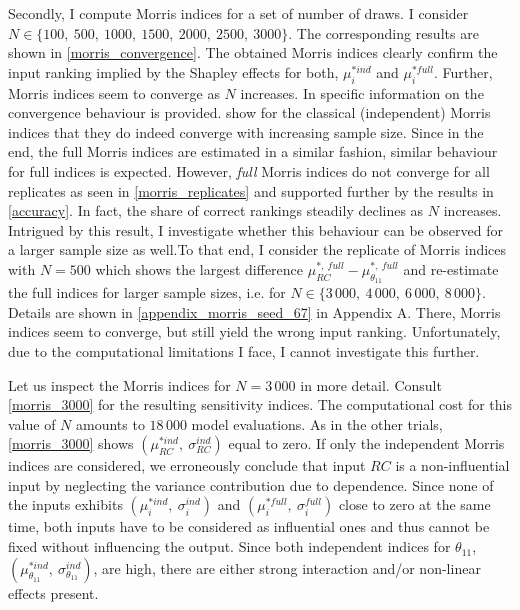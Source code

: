 Secondly, I compute Morris indices for a set of number of draws. I consider $N \in \{100,\ 500,\ 1000,\ 1500,\ 2000,\ 2500,\ 3000\}$. The corresponding results are shown in \cref{morris_convergence}. The obtained Morris indices clearly confirm the input ranking implied by the Shapley effects for both, $\mu^{\ast ind}_i$ and $\mu^{\ast full}_i$. Further, Morris indices
seem to converge as $N$ increases. In  specific information on the convergence behaviour is provided. \citet{ASAV19} show for the classical (independent) Morris indices that they do indeed converge with increasing sample size. Since in the end, the full Morris indices are estimated in a similar fashion, similar behaviour for full indices is expected. However, \textit{full} Morris indices do not converge for all replicates as seen in \cref{morris_replicates} and supported further by the results in \cref{accuracy}. In fact, the share of correct rankings steadily declines as $N$ increases. Intrigued by this result, I investigate whether this behaviour can be observed for a larger sample size as well.To that end, I consider the replicate of Morris indices with $N=500$ which shows the largest difference $\mu^{\ast,\ full}_{RC} - \mu^{\ast,\ full}_{\theta_{11}}$ and re-estimate the full indices for larger sample sizes, i.e. for $N \in \{3\,000,\ 4\,000,\ 6\,000,\ 8\,000\}$. Details are shown in \cref{appendix_morris_seed_67} in Appendix A. There, Morris indices seem to converge, but still yield the wrong input ranking. Unfortunately, due to the computational limitations I face, I cannot investigate this further.

Let us inspect the Morris indices for $N = 3\,000$ in more detail. Consult \cref{morris_3000} for the
resulting sensitivity indices. The computational cost for this value of $N$ amounts to $18\,000$
model evaluations. As in the other trials, \cref{morris_3000} shows $(\mu^{\ast ind}_{RC},\ \sigma_{RC}^{ind})$ equal to zero.
If only the independent Morris indices are considered, we erroneously
conclude that input $RC$ is a non-influential input by neglecting the variance contribution due to dependence. Since none of the inputs exhibits $(\mu^{\ast ind}_i,\ \sigma_i^{ind})$ and $(\mu^{\ast full}_i,\ \sigma_i^{full})$ close to zero at the same time, both inputs have to be considered as influential ones and thus cannot be fixed without influencing the output.
Since both independent indices for $\theta_{11}$, $(\mu^{\ast ind}_{\theta_{11}},\ \sigma_{\theta_{11}}^{ind})$, are high, there are either strong interaction and/or non-linear effects present.
